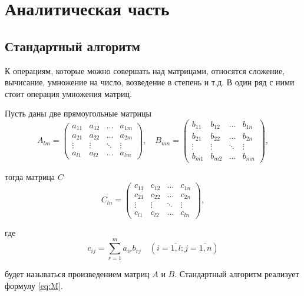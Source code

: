 \chapter{Аналитическая часть}

\section{Стандартный алгоритм}

К операциям, которые можно совершать над матрицами, относятся сложение, вычисание, умножение на число, возведение в степень и т.д. В один ряд с ними стоит операция умножения матриц. 


Пусть даны две прямоугольные матрицы
\begin{equation}
	A_{lm} = \begin{pmatrix}
		a_{11} & a_{12} & \ldots & a_{1m}\\
		a_{21} & a_{22} & \ldots & a_{2m}\\
		\vdots & \vdots & \ddots & \vdots\\
		a_{l1} & a_{l2} & \ldots & a_{lm}
	\end{pmatrix},
	\quad
		B_{mn} = \begin{pmatrix}
		b_{11} & b_{12} & \ldots & b_{1n}\\
		b_{21} & b_{22} & \ldots & b_{2n}\\
		\vdots & \vdots & \ddots & \vdots\\
		b_{m1} & b_{m2} & \ldots & b_{mn}
	\end{pmatrix},
\end{equation}

тогда матрица $C$
\begin{equation}
	C_{ln} = \begin{pmatrix}
		c_{11} & c_{12} & \ldots & c_{1n}\\
		c_{21} & c_{22} & \ldots & c_{2n}\\
		\vdots & \vdots & \ddots & \vdots\\
		c_{l1} & c_{l2} & \ldots & c_{ln}
	\end{pmatrix},
\end{equation}

где
\begin{equation}
	\label{eq:M}
	c_{ij} =
		\sum_{r=1}^{m} a_{ir}b_{rj} \quad (i=\overline{1,l}; j=\overline{1,n})
\end{equation}

будет называться произведением матриц $A$ и $B$.
Стандартный алгоритм реализует формулу  \ref{eq:M}.

